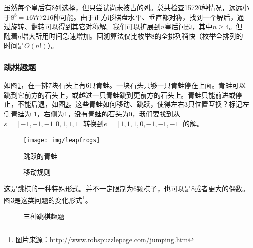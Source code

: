 \documentclass[b5paper]{ctexart}
\begin{document}
虽然每个皇后有8列选择，但只尝试尚未被占的列。总共检查15720种情况，远远小于$8^8 = 16777216$种可能\cite{wiki-8-queens}。由于正方形棋盘水平、垂直都对称，找到一个解后，通过旋转、翻转可以得到其它对称解。我们可以扩展到$n$皇后问题，其中$n \geq 4$。但随着$n$增大所用时间急速增加。回溯算法仅比枚举8的全排列稍快（枚举全排列的时间是$O(n!)$）。

\begin{Exercise}
\end{Exercise}

\subsubsection{跳棋趣题}

如图\ref{fig:leapfrog}，在一排7块石头上有6只青蛙。一块石头只够一只青蛙停在上面。青蛙可以跳到它前方的石头上，或越过一只青蛙跳到更前方的石头上。青蛙只能前进或停止，不能后退，如图\ref{fig:pegrules}。这些青蛙如何移动、跳跃，使得左右3只位置互换？标记左侧青蛙为-1，右侧为1，没有青蛙的石头为0，我们要找到从$s = [-1, -1, -1, 0, 1, 1, 1]$转换到$e = [1, 1, 1, 0, -1, -1, -1]$的解。

\begin{figure}[htbp]
 \centering
 \texttt{[image: img/leapfrogs]}
 \caption{跳跃的青蛙}
 \label{fig:leapfrog}
\end{figure}

\begin{figure}[htbp]
 \centering
  \hspace{0.02\textwidth}
  \hspace{0.02\textwidth}
 \caption{移动规则}
 \label{fig:pegrules}
\end{figure}

这是跳棋的一种特殊形式。并不一定限制为6颗棋子，也可以是8或者更大的偶数。图\ref{fig:pegpuzzles}是这类问题的变化形式\footnote{图片来源：\url{http://www.robspuzzlepage.com/jumping.htm}}。

\begin{figure}[htbp]
 \centering
  \hspace{0.02\textwidth}
  \hspace{0.02\textwidth}
 \caption{三种跳棋趣题}
 \label{fig:pegpuzzles}
\end{figure}
\end{document}
